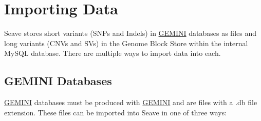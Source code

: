 \documentclass[11pt, a4paper]{article}
\newcommand{\GEMINI}{\href{https://gemini.readthedocs.io}{GEMINI} } %
\begin{document}

\section{Importing Data}

Seave stores short variants (SNPs and Indels) in \GEMINI databases as files and long variants (CNVs and SVs) in the Genome Block Store within the internal MySQL database. There are multiple ways to import data into each.


\subsection{GEMINI Databases}\label{geminiImport}

\GEMINI databases must be produced with \GEMINI and are files with a .db file extension. These files can be imported into Seave in one of three ways:
\end{document}

